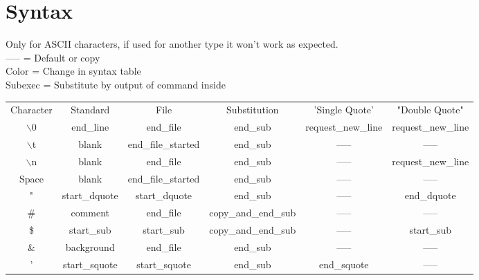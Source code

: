 \documentclass[12pt,a4paper]{report}
\begin{document}
\part{Syntax}
\noindent Only for ASCII characters, if used for another type it won't work as expected.\\
----- = Default or copy\\
Color = Change in syntax table\\
\textcolor[HTML]{C500FF}{Subexec} = Substitute by output of command inside
\begin{table}[H]
\begin{tabular}{ |c|c|c|c|c|c| }
	\hline
	\rowcolor{lightgray} \multicolumn{6}{|c|}{Extended Syntax Table} \\
	\hline
	Character & Standard & File \cellcolor[HTML]{BEE9F9}& Substitution \cellcolor[HTML]{FFF49C}& 'Single Quote' \cellcolor[HTML]{E1E1E1} & "Double Quote"\cellcolor[HTML]{C8F3BE} \\
	\hline
	$\backslash$0 & end\_line & end\_file \cellcolor[HTML]{BEE9F9}&  end\_sub \cellcolor[HTML]{FFF49C}& request\_new\_line & request\_new\_line \\
	$\backslash$t & blank & end\_file\_started \cellcolor[HTML]{BEE9F9}&  end\_sub \cellcolor[HTML]{FFF49C}& ----- & ----- \\
	$\backslash$n & blank & end\_file \cellcolor[HTML]{BEE9F9}&  end\_sub \cellcolor[HTML]{FFF49C}& ----- & request\_new\_line \\
	Space & blank & end\_file\_started \cellcolor[HTML]{BEE9F9}&  end\_sub\cellcolor[HTML]{FFF49C} & ----- & ----- \\
	" & start\_dquote \cellcolor[HTML]{C8F3BE}& start\_dquote \cellcolor[HTML]{C8F3BE}&  end\_sub\cellcolor[HTML]{FFF49C} & ----- & end\_dquote \cellcolor[HTML]{C8F3BE}\\
	\# & comment & end\_file \cellcolor[HTML]{BEE9F9}& copy\_and\_end\_sub \cellcolor[HTML]{FFF49C}& ----- & ----- \\
	\$ & start\_sub \cellcolor[HTML]{FFF49C}& start\_sub \cellcolor[HTML]{FFF49C} & copy\_and\_end\_sub \cellcolor[HTML]{FFF49C}& ----- & start\_sub \cellcolor[HTML]{FFF49C} \\
	\& & background & end\_file \cellcolor[HTML]{BEE9F9}&  end\_sub\cellcolor[HTML]{FFF49C} & ----- & ----- \\
	' & start\_squote \cellcolor[HTML]{E1E1E1}& start\_squote \cellcolor[HTML]{E1E1E1}&  end\_sub\cellcolor[HTML]{FFF49C} & end\_squote \cellcolor[HTML]{E1E1E1} & ----- \\

\end{tabular}
\end{table}
\end{document}
